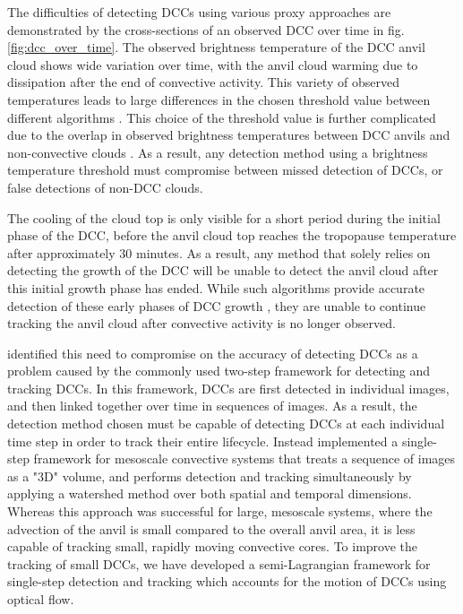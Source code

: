 The difficulties of detecting DCCs using various proxy approaches are demonstrated by the cross-sections of an observed DCC over time in fig. \ref{fig:dcc_over_time}.
The observed brightness temperature of the DCC anvil cloud shows wide variation over time, with the anvil cloud warming due to dissipation after the end of convective activity.
This variety of observed temperatures leads to large differences in the chosen threshold value between different algorithms \citep[see discussion in][]{bennartz_convective_2012}.
This choice of the threshold value is further complicated due to the overlap in observed brightness temperatures between DCC anvils and non-convective clouds \citep{konduru_new_2013}.
As a result, any detection method using a brightness temperature threshold must compromise between missed detection of DCCs, or false detections of non-DCC clouds.

The cooling of the cloud top is only visible for a short period during the initial phase of the DCC, before the anvil cloud top reaches the tropopause temperature after approximately 30 minutes.
As a result, any method that solely relies on detecting the growth of the DCC will be unable to detect the anvil cloud after this initial growth phase has ended.
While such algorithms provide accurate detection of these early phases of DCC growth \citep{zinner_validation_2013}, they are unable to continue tracking the anvil cloud after convective activity is no longer observed.

\citet{fiolleau_algorithm_2013} identified this need to compromise on the accuracy of detecting DCCs as a problem caused by the commonly used two-step framework for detecting and tracking DCCs.
In this framework, DCCs are first detected in individual images, and then linked together over time in sequences of images.
As a result, the detection method chosen must be capable of detecting DCCs at each individual time step in order to track their entire lifecycle.
Instead \citet{fiolleau_algorithm_2013} implemented a single-step framework for mesoscale convective systems that treats a sequence of images as a "3D" volume, and performs detection and tracking simultaneously by applying a watershed method over both spatial and temporal dimensions.
Whereas this approach was successful for large, mesoscale systems, where the advection of the anvil is small compared to the overall anvil area, it is less capable of tracking small, rapidly moving convective cores.
To improve the tracking of small DCCs, we have developed a semi-Lagrangian framework for single-step detection and tracking which accounts for the motion of DCCs using optical flow.


